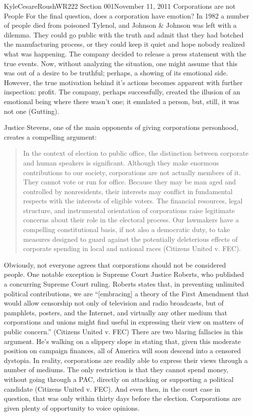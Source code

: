 \documentclass[12pt,letterpaper]{article}
\begin{document}
\begin{mla}{Kyle}{Cesare}{Roush}{WR222 Section 001}{November 11, 2011}{
Corporations are not People}
For the final question, does a corporation have emotion?  In 1982 a number of
people died from poisoned Tylenol, and Johnson \& Johnson was left with a
dilemma.  They could go public with the truth and admit that they had botched
the manufacturing process, or they could keep it quiet and hope nobody realized
what was happening.  The company decided to release a press statement with the
true events.  Now, without analyzing the situation, one might assume that this
was out of a desire to be truthful; perhaps, a showing of its emotional side.
However, the true motivation behind it's actions becomes apparent with further
inspection: profit.  The company, perhaps successfully, created the illusion of
an emotional being where there wasn't one; it emulated a person, but, still, it
was not one (Gutting).

Justice Stevens, one of the main opponents of giving corporations personhood,
creates a compelling argument:

\begin{quote}
In the context of election to public office, the distinction between corporate
and human speakers is significant.  Although they make enormous contributions to
our society, corporations are not actually members of it. They cannot vote or
run for office. Because they may be man aged and controlled by nonresidents,
their interests may conflict in fundamental respects with the interests of
eligible voters. The financial resources, legal structure, and instrumental
orientation of corporations raise legitimate concerns about their role in the
electoral process.  Our lawmakers have a compelling constitutional basis, if not
also a democratic duty, to take measures designed to guard against the
potentially deleterious effects of corporate spending in local and national
races (Citizens United v. FEC).
\end{quote}


Obviously, not everyone agrees that corporations should not be considered
people.  One notable exception is Supreme Court Justice Roberts, who published a
concurring Supreme Court ruling.  Roberts states that, in preventing unlimited
political contributions, we are ``[embracing] a theory of the First Amendment
that would allow censorship not only of television and radio broadcasts, but of
pamphlets, posters, and the Internet, and virtually any other medium that
corporations and unions might find useful in expressing their view on matters of
public concern.'' (Citizens United v. FEC)  There are two blaring fallacies in
this argument.  He's walking on a slippery slope in stating that, given this
moderate position on campaign finances, all of America will soon descend into a
censored dystopia.  In reality, corporations are readily able to express their
views through a number of mediums.  The only restriction is that they cannot
spend money, without going through a PAC, directly on attacking or supporting a
political candidate (Citizens United v.  FEC).  And even then, in the court case
in question, that was only within thirty days before the election.  Corporations
are given plenty of opportunity to voice opinions.


\end{mla}
\end{document}
